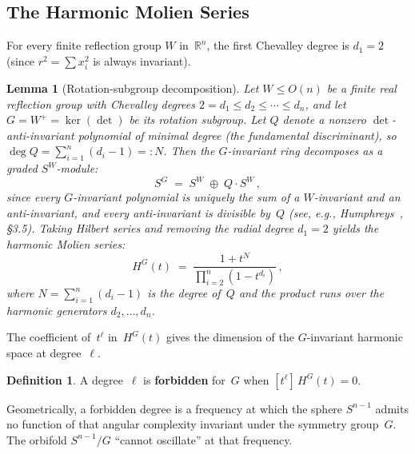 \documentclass[11pt,letterpaper]{article}
\newtheorem{lemma}[theorem]{Lemma}
\theoremstyle{definition}
\newtheorem{definition}[theorem]{Definition}
\begin{document}
\subsection{The Harmonic Molien Series}
For every finite reflection group $W$ in~$\mathbb{R}^n$, the first Chevalley degree is $d_1=2$ (since $r^2=\sum x_i^2$ is always invariant).
\begin{lemma}[Rotation-subgroup decomposition]\label{lem:decomp}
Let $W\le O(n)$ be a finite real reflection group with Chevalley degrees $2=d_1\le d_2\le\cdots\le d_n$, and let $G=W^+=\ker(\det)$ be its rotation subgroup.  Let $Q$ denote a nonzero $\det$-anti-invariant polynomial of minimal degree (the fundamental discriminant), so $\deg Q=\sum_{i=1}^n(d_i-1)=:N$.  Then the $G$-invariant ring decomposes as a graded $S^W$-module:
\[
  S^{G} \;=\; S^W \;\oplus\; Q\cdot S^W\,,
\]
since every $G$-invariant polynomial is uniquely the sum of a $W$-invariant and an anti-invariant, and every anti-invariant is divisible by~$Q$ \textup{(see, e.g., Humphreys~\cite{Humphreys90}, \S3.5)}.  Taking Hilbert series and removing the radial degree $d_1=2$ yields the harmonic Molien series:
\begin{equation}\label{eq:molien}
  H^G(t) \;=\; \frac{1+t^N}{\displaystyle\prod_{i=2}^{n}(1-t^{d_i})}\,,
\end{equation}
where $N=\sum_{i=1}^{n}(d_i-1)$ is the degree of~$Q$ and the product runs over the harmonic generators $d_2,\dots,d_n$.
\end{lemma}
The coefficient of~$t^\ell$ in~$H^G(t)$ gives the dimension of the $G$-invariant harmonic space at degree~$\ell$.
\begin{definition}\label{def:forbidden}
A degree~$\ell$ is \textbf{forbidden} for~$G$ when $[t^\ell]\,H^G(t)=0$.
\end{definition}
Geometrically, a forbidden degree is a frequency at which the sphere $S^{n-1}$ admits no function of that angular complexity invariant under the symmetry group~$G$.  The orbifold $S^{n-1}/G$ ``cannot oscillate'' at that frequency.
\end{document}
